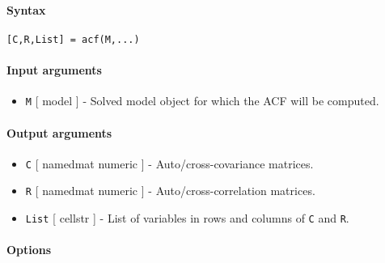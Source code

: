 


	\paragraph{Syntax}\label{syntax}

\begin{verbatim}
[C,R,List] = acf(M,...)
\end{verbatim}

\paragraph{Input arguments}\label{input-arguments}

\begin{itemize}
\itemsep1pt\parskip0pt
\item
  \texttt{M} {[} model {]} - Solved model object for which the ACF will
  be computed.
\end{itemize}

\paragraph{Output arguments}\label{output-arguments}

\begin{itemize}
\item
  \texttt{C} {[} namedmat \textbar{} numeric {]} - Auto/cross-covariance
  matrices.
\item
  \texttt{R} {[} namedmat \textbar{} numeric {]} -
  Auto/cross-correlation matrices.
\item
  \texttt{List} {[} cellstr {]} - List of variables in rows and columns
  of \texttt{C} and \texttt{R}.
\end{itemize}

\paragraph{Options}\label{options}

